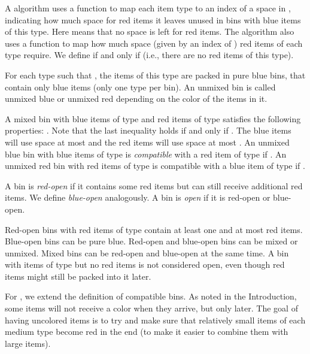 A {\SuperH} algorithm uses a function   to map each item type to an index of a space in , indicating
how much space for red items it leaves unused in bins with blue items of this type. Here  means that no space is left for red items.
The algorithm also uses a function  to map
how much space (given by an index of ) red items of each type require.
We define  if and only if  (i.e., there are no red items of this type).

For each type  such that , 
the items of this type are packed in pure blue bins, that contain only blue items (only one type per bin).
An unmixed bin is called unmixed blue or unmixed red depending on the color of the items in it.

A mixed bin with blue items of type  and red items of type  satisfies the following properties:
.
Note that the last inequality holds if and only if .
The blue items will use space at most  and the red items will use
space at most .
An unmixed blue bin with blue items of type  is \emph{compatible} with a red item of type 
	if .
	An unmixed red bin with red items of type  is {compatible} with a blue item of type  if .


\begin{definition}
	A bin is \emph{red-open} if it contains some red items but can still receive additional red items. 
	We define \emph{blue-open} analogously. 
	A bin is \emph{open} if it is red-open or blue-open. 
\end{definition}

Red-open bins with red items of type  contain at least one and at most  red items.
Blue-open bins can be pure blue.
Red-open and blue-open bins can be mixed or unmixed.
Mixed bins can be red-open and blue-open at the same time.
A bin with  items of type  but no red items is not considered open, 
even though red items might still be packed into it later.


For {\EHarm}, we extend the definition of compatible bins.
As noted in the Introduction, some items will not receive a color when they arrive, but only later.
The goal of having uncolored items is to try and make sure that relatively small items of each medium type become red in the end
(to make it easier to combine them with large items).

